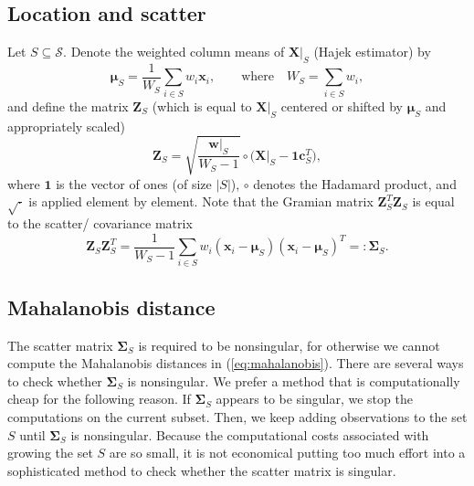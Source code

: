 \documentclass[a4paper,oneside,11pt,DIV=12]{scrartcl}
\begin{document}
\subsection{Location and scatter}
Let $S \subseteq \mathscr{S}$. Denote the weighted column means of
$\bm X \vert_S$ (Hajek estimator) by
 \begin{equation}\label{eq:weightedmean}
 	\bm \mu_S = \frac{1}{W_S}\sum_{i \in S} w_i \bm x_i, \qquad \text{where}
		\quad W_S = \sum_{i \in S} w_i,
 \end{equation}
\noindent and define the matrix $\bm Z_S$ (which is equal to
$\bm X\vert_S$ centered or shifted by $\bm \mu_S$ and appropriately scaled)
\begin{equation}\label{eq:x_centered_scaled}
	\bm Z_S = \sqrt{\frac{\bm w\vert_S}{W_S - 1}} \circ
		\big( \bm X\vert_S - \bm 1 \bm c_S^T \big),
\end{equation}
\noindent where $\bm 1$ is the vector of ones (of size $\vert S \vert$),
$\circ$ denotes the Hadamard product, and $\sqrt{\cdot}$ is applied
element by element. Note that the Gramian matrix $\bm Z_S^T \bm Z_S$
is equal to the scatter/ covariance matrix
\begin{equation}\label{eq:weightedsigma}
	\bm Z_S \bm Z_S^T = \frac{1}{W_S - 1}\sum_{i \in S} w_i
		(\bm x_i - \bm \mu_S)(\bm x_i - \bm \mu_S)^T =:	\bm \Sigma_S.
\end{equation}

\subsection{Mahalanobis distance}
The scatter matrix $\bm \Sigma_S$ is required to be nonsingular, for
otherwise we cannot compute the Mahalanobis distances in
(\ref{eq:mahalanobis}). There are several ways to check whether
$\bm \Sigma_S$ is nonsingular. We prefer a method that is computationally
cheap for the following reason. If $\bm \Sigma_S$ appears to be
singular, we stop the computations on the current subset. Then, we
keep adding observations to the set $S$ until $\bm \Sigma_S$ is
nonsingular. Because the computational costs associated with growing
the set $S$ are so small, it is not economical putting too much
effort into a sophisticated method to check whether the scatter
matrix is singular.
\end{document}
